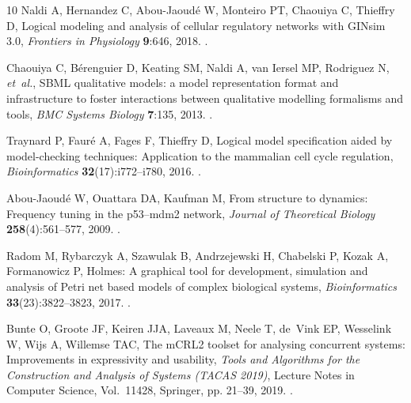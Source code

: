 \documentclass{ws-jbcb}
\numberwithin{equation}{section}
\begin{document}
\begin{thebibliography}{10}
Naldi A, Hernandez C, Abou-Jaoud\'e W, Monteiro PT, Chaouiya C, Thieffry D,
  Logical modeling and analysis of cellular regulatory networks with {GINsim}
  3.0, \emph{Frontiers in Physiology} \textbf{9}:646, 2018.
\newblock {}.

Chaouiya C, B\'erenguier D, Keating SM, Naldi A, van Iersel MP, Rodriguez N,
  \emph{et~al.}, {SBML} qualitative models: a model representation format and
  infrastructure to foster interactions between qualitative modelling
  formalisms and tools, \emph{BMC Systems Biology} \textbf{7}:135, 2013.
\newblock {}.

Traynard P, Faur\'e A, Fages F, Thieffry D, Logical model specification aided
  by model-checking techniques: Application to the mammalian cell cycle
  regulation, \emph{Bioinformatics} \textbf{32}(17):i772--i780, 2016.
\newblock {}.

Abou-Jaoud\'e W, Ouattara DA, Kaufman M, From structure to dynamics: Frequency
  tuning in the p53--mdm2 network, \emph{Journal of Theoretical Biology}
  \textbf{258}(4):561--577, 2009.
\newblock {}.

Radom M, Rybarczyk A, Szawulak B, Andrzejewski H, Chabelski P, Kozak A,
  Formanowicz P, Holmes: A graphical tool for development, simulation and
  analysis of {Petri} net based models of complex biological systems,
  \emph{Bioinformatics} \textbf{33}(23):3822--3823, 2017.
\newblock {}.

Bunte O, Groote JF, Keiren JJA, Laveaux M, Neele T, de~Vink EP, Wesselink W,
  Wijs A, Willemse TAC, The {mCRL2} toolset for analysing concurrent systems:
  Improvements in expressivity and usability,  \emph{Tools and Algorithms for
  the Construction and Analysis of Systems (TACAS 2019)}, Lecture Notes in
  Computer Science, Vol.~11428, Springer, pp. 21--39, 2019.
\newblock {}.

\end{thebibliography}
\end{document}
